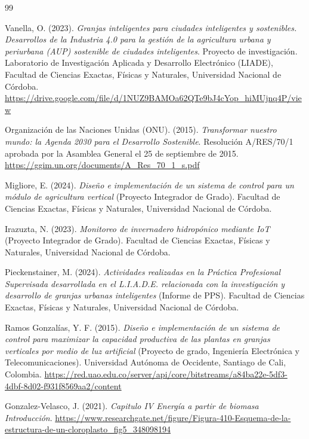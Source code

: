 \renewcommand{\bibname}{Referencias}
\begin{thebibliography}{99}
\setcounter{enumiv}{12} %

Vanella, O. (2023). \textit{Granjas inteligentes para ciudades inteligentes y sostenibles. Desarrollos de la Industria 4.0 para la gestión de la agricultura urbana y periurbana (AUP) sostenible de ciudades inteligentes}. Proyecto de investigación. Laboratorio de Investigación Aplicada y Desarrollo Electrónico (LIADE), Facultad de Ciencias Exactas, Físicas y Naturales, Universidad Nacional de Córdoba. \url{https://drive.google.com/file/d/1NUZ9BAMOa62QTe9bJ4cYop_hiMUjnq4P/view}

Organización de las Naciones Unidas (ONU). (2015). \textit{Transformar nuestro mundo: la Agenda 2030 para el Desarrollo Sostenible}. Resolución A/RES/70/1 aprobada por la Asamblea General el 25 de septiembre de 2015. \url{https://ggim.un.org/documents/A_Res_70_1_s.pdf}

Migliore, E. (2024). \textit{Diseño e implementación de un sistema de control para un módulo de agricultura vertical} (Proyecto Integrador de Grado). Facultad de Ciencias Exactas, Físicas y Naturales, Universidad Nacional de Córdoba.

Irazuzta, N. (2023). \textit{Monitoreo de invernadero hidropónico mediante IoT} (Proyecto Integrador de Grado). Facultad de Ciencias Exactas, Físicas y Naturales, Universidad Nacional de Córdoba.

Pieckenstainer, M. (2024). \textit{Actividades realizadas en la Práctica Profesional Supervisada desarrollada en el L.I.A.D.E. relacionada con la investigación y desarrollo de granjas urbanas inteligentes} (Informe de PPS). Facultad de Ciencias Exactas, Físicas y Naturales, Universidad Nacional de Córdoba.

Ramos Gonzalías, Y. F. (2015). \textit{Diseño e implementación de un sistema de control para maximizar la capacidad productiva de las plantas en granjas verticales por medio de luz artificial} (Proyecto de grado, Ingeniería Electrónica y Telecomunicaciones). Universidad Autónoma de Occidente, Santiago de Cali, Colombia. \url{https://red.uao.edu.co/server/api/core/bitstreams/a84ba22e-5df3-4dbf-8d02-f931f8569aa2/content}

Gonzalez-Velasco, J. (2021). \textit{Capitulo IV Energía a partir de biomasa Introducción}. \url{https://www.researchgate.net/figure/Figura-410-Esquema-de-la-estructura-de-un-cloroplasto_fig5_348098194}


\end{thebibliography}
